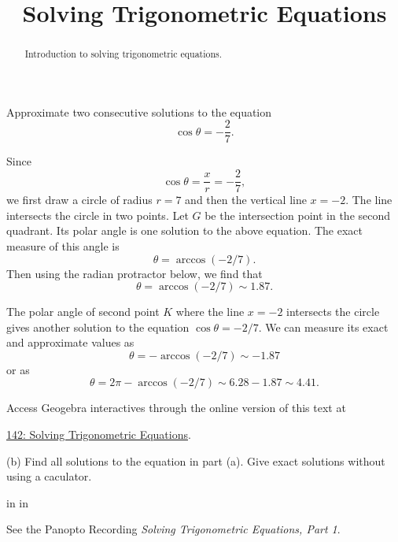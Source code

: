 \documentclass{ximera}
\title{Solving Trigonometric Equations}
\newcommand{\pskip}{\vskip 0.1 in}
\begin{document}
\begin{abstract}
Introduction to solving trigonometric equations.
\end{abstract}
\maketitle



\begin{example}  \label{Ex:43733g3e}
Approximate two consecutive solutions to the equation
\[
    \cos\theta =   -\frac{2}{7} .
\]

\begin{explanation}
 
Since
\[
   \cos \theta = \frac{x}{r} = -\frac{2}{7} ,
\]
we first draw a circle of radius $r=7$ and then the vertical line $x=-2$. The line intersects the circle in two points. Let $G$ be the intersection point in the second quadrant. Its polar angle is one solution to the above equation. The exact measure of this angle is 
\[
  \theta = \arccos(-2/7).
\]
Then using the radian protractor below, we find that
\[
   \theta  = \arccos(-2/7) \sim 1.87 .
\]

The polar angle of second point $K$ where the line $x=-2$ intersects the circle gives another solution to the equation $\cos\theta = -2/7$. We can measure its exact and approximate values as
\[
   \theta = -\arccos(-2/7) \sim -1.87 
\]
or as
\[
       \theta = 2\pi - \arccos(-2/7) \sim 6.28 - 1.87 \sim 4.41 .
\]


 
\begin{onlineOnly}
    \begin{center}
\end{center}
\end{onlineOnly}

Access Geogebra interactives through the online version of this text at
 
\href{https://www.geogebra.org/classic/qnhtd4h8}{142: Solving Trigonometric Equations}.


\end{explanation}

(b) Find all solutions to the equation in part (a). Give exact solutions without using a caculator.

\pskip \pskip

See the Panopto Recording \emph{Solving Trigonometric Equations, Part 1}.


\end{example}
\end{document}
